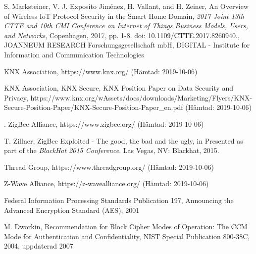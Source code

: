 \documentclass[conference]{IEEEtran}
\begin{document}
\begin{thebibliography}{1}
S. Marksteiner, V. J. Exposito Jiménez, H. Vallant, and H. Zeiner, An Overview of Wireless IoT Protocol Security in the Smart Home Domain, \emph{2017 Joint 13th CTTE and 10th CMI Conference on Internet of Things Business Models, Users, and Networks}, Copenhagen, 2017, pp. 1-8. doi: 10.1109/CTTE.2017.8260940., JOANNEUM RESEARCH Forschungsgesellschaft mbH, DIGITAL - Institute for Information and Communication Technologies


KNX Association, https://www.knx.org/ (Hämtad: 2019-10-06)

  KNX Association, KNX Secure, KNX Position Paper on Data Security and Privacy, https://www.knx.org/wAssets/docs/downloads/Marketing/Flyers/KNX-Secure-Position-Paper/KNX-Secure-Position-Paper\_en.pdf (Hämtad: 2019-10-06)


  \bibitem{}.
ZigBee Alliance, https://www.zigbee.org/ (Hämtad: 2019-10-06)

T. Zillner, ZigBee Exploited - The good, the bad and the ugly, in Presented as part of the \emph{BlackHat 2015 Conference}. Las Vegas, NV: Blackhat, 2015. 

Thread Group, https://www.threadgroup.org/ (Hämtad: 2019-10-06) 

Z-Wave Alliance, https://z-wavealliance.org/ (Hämtad: 2019-10-06)

Federal Information Processing Standards Publication 197, Announcing the Advanced Encryption Standard (AES), 2001

M. Dworkin, Recommendation for Block Cipher Modes of Operation: The CCM Mode for Authentication and Confidentiality, NIST Special Publication 800-38C, 2004, uppdaterad 2007

\end{thebibliography}



\end{document}

